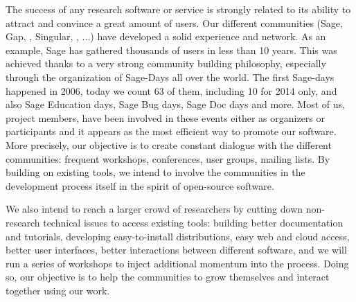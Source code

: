 \documentclass[noworkareas,deliverables,keys]{euproposal}                  %
\begin{document}
\begin{proposal}
The success of any research software or service is strongly related to
its ability to attract and convince a great amount of users. Our
different communities (Sage, Gap, \PariGP, Singular, \Jupyter, ...) have developed
a solid experience and network. As an example, Sage has gathered
thousands of users in less than 10 years. This was achieved thanks to
a very strong community building philosophy, especially through the
organization of Sage-Days all over the world. The first Sage-days
happened in 2006, today we count 63 of them, including 10 for 2014
only, and also Sage Education days, Sage Bug days, Sage Doc days and
more. Most of us, \TheProject{} project members, have been involved in
these events either as organizers or participants and it appears as
the most efficient way to promote our software. More precisely, our
objective is to create constant dialogue with the different
communities: frequent workshops, conferences, user groups, mailing
lists. By building on existing tools, we intend to involve the
communities in the development process itself in the spirit of
open-source software.

We also intend to reach a larger crowd of researchers by cutting down
non-research technical issues to access existing tools: building
better documentation and tutorials, developing easy-to-install
distributions, easy web and cloud access, better user interfaces,
better interactions between different software, and we will run a
series of workshops to inject additional momentum into the
process. Doing so, our objective is to help the communities to grow
themselves and interact together using our work.


\clearpage

\draftpage


\draftpage


\draftpage


\draftpage



\end{proposal}
\end{document}
